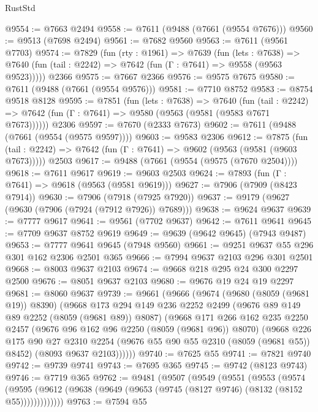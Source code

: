 \begin{lexlean}{RustStd}
\begin{coremodule}
@9554 := @7663 @2494
@9558 := @7611 (@9488 (@7661 (@9554 @7676)))
@9560 := @9513 (@7698 @2494)
@9561 := @7682 @9560
@9563 := @7611 (@9561 @7703)
@9574 := @7829
    (fun (rty : @1961) =>
    @7639
      (fun (lets : @7638) =>
      @7640 (fun (tail : @2242) => @7642 (fun (Γ : @7641) => @9558 (@9563 @9523)))))
    @2366
@9575 := @7667 @2366
@9576 := @9575 @7675
@9580 := @7611 (@9488 (@7661 (@9554 @9576)))
@9581 := @7710 @8752
@9583 := @8754 @9518 @8128
@9595 := @7851
    (fun (lets : @7638) =>
    @7640
      (fun (tail : @2242) => @7642 (fun (Γ : @7641) => @9580 (@9563 (@9581 (@9583 @7671 @7673))))))
    @2306
@9597 := @7670 (@2333 @7673)
@9602 := @7611 (@9488 (@7661 (@9554 (@9575 @9597))))
@9603 := @9583 @2306
@9612 := @7875
    (fun (tail : @2242) => @7642 (fun (Γ : @7641) => @9602 (@9563 (@9581 (@9603 @7673)))))
    @2503
@9617 := @9488 (@7661 (@9554 (@9575 (@7670 @2504))))
@9618 := @7611 @9617
@9619 := @9603 @2503
@9624 := @7893 (fun (Γ : @7641) => @9618 (@9563 (@9581 @9619)))
@9627 := @7906 (@7909 (@8423 @7914))
@9630 := @7906 (@7918 (@7925 @7920))
@9637 := @9179 (@9627 (@9630 (@7906 (@7924 (@7912 @7926)) @7689)))
@9638 := @9624 @9637
@9639 := @7777 @9617
@9641 := @9561 (@7702 @9637)
@9642 := @7611 @9641
@9645 := @7709 @9637 @8752 @9619
@9649 := @9639 (@9642 @9645) (@7943 @9487)
@9653 := @7777 @9641 @9645 (@7948 @9560)
@9661 := @9251 @9637 @55 @296 @301 @162 @2306 @2501 @365
@9666 := @7994 @9637 @2103 @296 @301 @2501
@9668 := @8003 @9637 @2103
@9674 := @9668 @218 @295 @24 @300 @2297 @2500
@9676 := @8051 @9637 @2103
@9680 := @9676 @19 @24 @19 @2297
@9681 := @8060 @9637
@9739 := @9661
    (@9666
      (@9674
        (@9680 (@8059 (@9681 @19)) @8390)
        (@9668
          @173
          @294
          @149
          @236
          @2252
          @2499
          (@9676 @89 @149 @89 @2252 (@8059 (@9681 @89)) @8087)
          (@9668
            @171
            @266
            @162
            @235
            @2250
            @2457
            (@9676 @96 @162 @96 @2250 (@8059 (@9681 @96)) @8070)
            (@9668
              @226
              @175
              @90
              @27
              @2310
              @2254
              (@9676 @55 @90 @55 @2310 (@8059 (@9681 @55)) @8452)
              (@8093 @9637 @2103))))))
@9740 := @7625 @55
@9741 := @7821 @9740
@9742 := @9739 @9741
@9743 := @7695 @365
@9745 := @9742 (@8123 @9743)
@9746 := @7719 @365
@9762 := @9481
    (@9507
      (@9549
        (@9551
          (@9553
            (@9574
              (@9595 (@9612 (@9638 (@9649 (@9653 (@9745 (@8127 @9746) (@8132 (@8152 @55)))))))))))))
@9763 := @7594 @55

\end{coremodule}
\end{lexlean}
